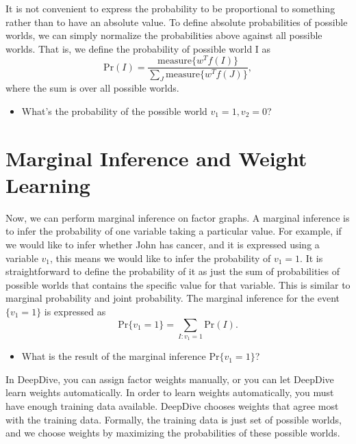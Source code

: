\documentclass[11pt]{article}
\begin{document}
It is not convenient to express the probability to be proportional to something rather than to have an absolute value. To define absolute probabilities of possible worlds, we can simply normalize the probabilities above against all possible worlds. That is, we define the probability of possible world I as
\[ \text{Pr}(I) = \frac{\text{measure}\{w^T f(I)\}}{\sum_{J} \text{measure}\{w^T f(J)\}}, \]
where the sum is over all possible worlds.
\begin{itemize}
\item What's the probability of the possible world $v_1=1,v_2=0$?
\end{itemize}

\section{Marginal Inference and Weight Learning}

Now, we can perform marginal inference on factor graphs. A marginal inference is to infer the probability of one variable taking a particular value. For example, if we would like to infer whether John has cancer, and it is expressed using a variable $v_1$, this means we would like to infer the probability of $v_1 = 1$. It is straightforward to define the probability of it as just the sum of probabilities of possible worlds that contains the specific value for that variable. This is similar to marginal probability and joint probability. The marginal inference for the event $\{v_1 = 1\}$ is expressed as
\[ \text{Pr}\{v_1 = 1\} = \sum_{I:v_1=1} \text{Pr}(I). \]
\begin{itemize}
\item What is the result of the marginal inference $\text{Pr}\{v_1 = 1\}$?
\end{itemize}

In DeepDive, you can assign factor weights manually, or you can let DeepDive learn weights automatically. In order to learn weights automatically, you must have enough training data available. DeepDive chooses weights that agree most with the training data. Formally, the training data is just set of possible worlds, and we choose weights by maximizing the probabilities of these possible worlds.
\end{document}
